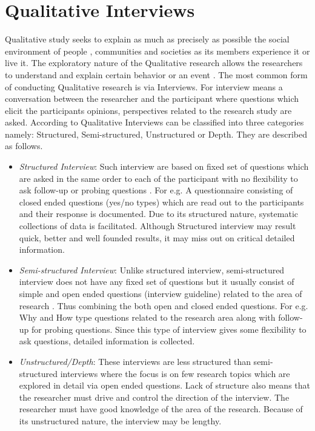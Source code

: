 \section{Qualitative Interviews}
Qualitative study seeks to explain as much as precisely as possible the social environment of people , communities and societies as its members experience it or live it. The exploratory nature of the Qualitative research allows the researchers to understand and explain certain behavior or an event \autocite[52]{demarrais2004qualitative}. The most common form of conducting Qualitative research is via Interviews. For \textcite[54]{demarrais2004qualitative}
interview means a conversation between the researcher and the participant where questions which elicit the participants opinions, perspectives related to the research study are asked. According to \textcite[251]{britten1995qualitative} Qualitative Interviews can be classified into three categories namely: Structured, Semi-structured, Unstructured or Depth. They are described as follows.
\begin{itemize}
    \item \textit{Structured Interview}: Such interview are based on fixed set of questions which are asked in the same order to each of the participant with no flexibility to ask follow-up or probing questions \autocite[65]{fylan2005semi}. For e.g. A questionnaire consisting of closed ended questions (yes/no types) which are read out to the participants and their response is documented.  Due to its structured nature, systematic collections of data is facilitated. Although Structured interview may result quick, better and well founded results, it may miss out on critical detailed information.
    
    \item \textit{Semi-structured Interview}: Unlike structured interview, semi-structured interview does not have any fixed set of questions but it usually consist of simple and open ended questions (interview guideline) related to the area of research \autocite[65]{fylan2005semi}. Thus combining the both open and closed ended questions. For e.g. Why and How type questions related to the research area along with follow-up for probing questions. Since this type of interview gives some flexibility to ask questions, detailed information is collected.
    
    \item \textit{Unstructured/Depth}: These interviews are less structured than semi-structured interviews where the focus is on few research topics which are explored in detail via open ended questions\autocite[251]{britten1995qualitative}. Lack of structure also means that the researcher must drive and control the direction of the interview. The researcher must have good knowledge of the area of the research. Because of its unstructured nature, the interview may be lengthy.
\end{itemize}

